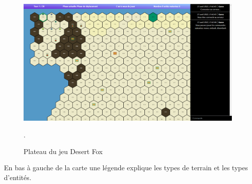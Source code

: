 \begin{figure}[H]
    \centering
    \includegraphics[scale=0.35]{data/plateau_du_jeu.png}
    \caption{Plateau du jeu Desert Fox}.
\end{figure}

En bas à gauche de la carte une légende explique les types de terrain et les types d'entités.\\


